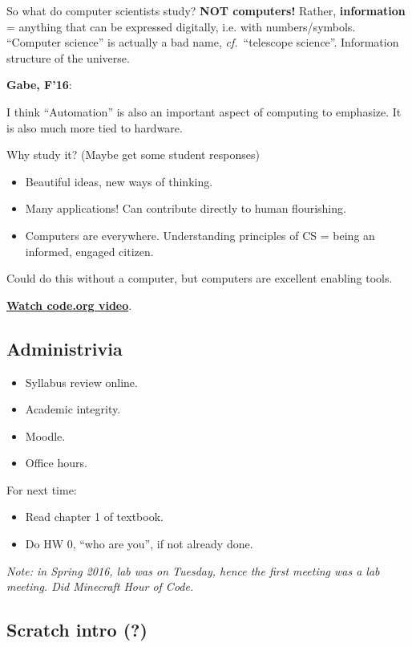 \documentclass{article}
\newenvironment{reflect}[1]
{
  \noindent
  \begin{lrbox}{\reflectbox}
    \begin{minipage}[t]{\textwidth}
      \textbf{#1}:
}{
    \end{minipage}
  \end{lrbox}
  \fbox{\usebox{\reflectbox}}
}
\begin{document}
So what do computer scientists study?  \textbf{NOT computers!}
Rather, \textbf{information} = anything that can be expressed digitally,
i.e. with numbers/symbols.  ``Computer science'' is actually a bad
name, \emph{cf.}\ ``telescope science''.  Information structure of the
universe.

\begin{reflect}{Gabe, F'16}
I think ``Automation'' is also an important aspect of computing to emphasize. It is also much more tied to hardware.
\end{reflect}

Why study it?  (Maybe get some student responses)
\begin{itemize}
\item Beautiful ideas, new ways of thinking.
\item Many applications!  Can contribute directly to human flourishing.
\item Computers are everywhere.  Understanding principles of CS =
  being an informed, engaged citizen.
\end{itemize}
Could do this without a computer, but computers are excellent enabling
tools.

\href{https://www.youtube.com/watch?v=qYZF6oIZtfc}{\textbf{Watch code.org video}}.

\subsection*{Administrivia}

\begin{itemize}
\item Syllabus review online.
\item Academic integrity.
\item Moodle.
\item Office hours.
\end{itemize}

For next time:

\begin{itemize}
\item Read chapter 1 of textbook.
\item Do HW 0, ``who are you'', if not already done.
\end{itemize}

\emph{Note: in Spring 2016, lab was on Tuesday, hence the first
  meeting was a lab meeting.  Did Minecraft Hour of Code.}

\subsection*{Scratch intro (?)}
\end{document}
